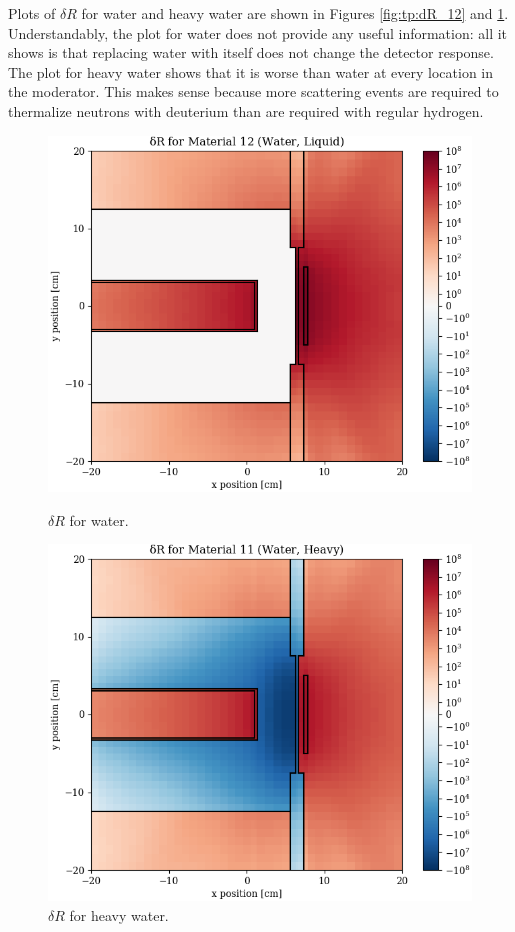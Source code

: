 Plots of $\delta R$ for water and heavy water are shown in Figures \ref{fig:tp:dR_12} and \ref{fig:tp:dR_11}.
Understandably, the plot for water does not provide any useful information: all it shows is that replacing water with itself does not change the detector response.
The plot for heavy water shows that it is worse than water at every location in the moderator.
This makes sense because more scattering events are required to thermalize neutrons with deuterium than are required with regular hydrogen.

\begin{figure}
  \begin{minipage}{0.49\linewidth}
    \centering
    \includegraphics[width=\linewidth]{content/testprob/dR_12.png}
    \caption{$\delta R$ for water.}
    \label{fig:tp:dR_12}
  \end{minipage}
  \hfill
  \begin{minipage}{0.49\linewidth}
    \centering
    \includegraphics[width=\linewidth]{content/testprob/dR_11.png}
    \caption{$\delta R$ for heavy water.}
    \label{fig:tp:dR_11}
  \end{minipage}
\end{figure}

